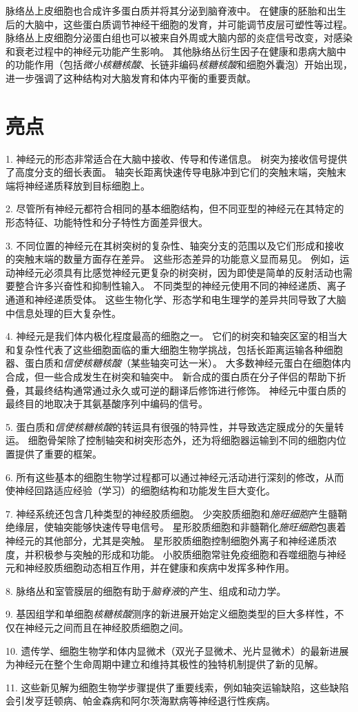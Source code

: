 脉络丛上皮细胞也合成许多蛋白质并将其分泌到脑脊液中。
在健康的胚胎和出生后的大脑中，这些蛋白质调节神经干细胞的发育，并可能调节皮层可塑性等过程。
脉络丛上皮细胞分泌蛋白组也可以被来自外周或大脑内部的炎症信号改变，对感染和衰老过程中的神经元功能产生影响。
其他脉络丛衍生因子在健康和患病大脑中的功能作用（包括\textit{微小核糖核酸}、长链非编码\textit{核糖核酸}和细胞外囊泡）开始出现，进一步强调了这种结构对大脑发育和体内平衡的重要贡献。



\section{亮点}

1. 神经元的形态非常适合在大脑中接收、传导和传递信息。
树突为接收信号提供了高度分支的细长表面。
轴突长距离快速传导电脉冲到它们的突触末端，突触末端将神经递质释放到目标细胞上。


2. 尽管所有神经元都符合相同的基本细胞结构，但不同亚型的神经元在其特定的形态特征、功能特性和分子特性方面差异很大。


3. 不同位置的神经元在其树突树的复杂性、轴突分支的范围以及它们形成和接收的突触末端的数量方面存在差异。
这些形态差异的功能意义显而易见。
例如，运动神经元必须具有比感觉神经元更复杂的树突树，因为即使是简单的反射活动也需要整合许多兴奋性和抑制性输入。
不同类型的神经元使用不同的神经递质、离子通道和神经递质受体。
这些生物化学、形态学和电生理学的差异共同导致了大脑中信息处理的巨大复杂性。


4. 神经元是我们体内极化程度最高的细胞之一。
它们的树突和轴突区室的相当大和复杂性代表了这些细胞面临的重大细胞生物学挑战，包括长距离运输各种细胞器、蛋白质和\textit{信使核糖核酸}（某些轴突可达一米）。
大多数神经元蛋白在细胞体内合成，但一些合成发生在树突和轴突中。
新合成的蛋白质在分子伴侣的帮助下折叠，其最终结构通常通过永久或可逆的翻译后修饰进行修饰。
神经元中蛋白质的最终目的地取决于其氨基酸序列中编码的信号。


5. 蛋白质和\textit{信使核糖核酸}的转运具有很强的特异性，并导致选定膜成分的矢量转运。
细胞骨架除了控制轴突和树突形态外，还为将细胞器运输到不同的细胞内位置提供了重要的框架。


6. 所有这些基本的细胞生物学过程都可以通过神经元活动进行深刻的修改，从而使神经回路适应经验（学习）的细胞结构和功能发生巨大变化。


7. 神经系统还包含几种类型的神经胶质细胞。
少突胶质细胞和\textit{施旺细胞}产生髓鞘绝缘层，使轴突能够快速传导电信号。
星形胶质细胞和非髓鞘化\textit{施旺细胞}包裹着神经元的其他部分，尤其是突触。 
星形胶质细胞控制细胞外离子和神经递质浓度，并积极参与突触的形成和功能。
小胶质细胞常驻免疫细胞和吞噬细胞与神经元和神经胶质细胞动态相互作用，并在健康和疾病中发挥多种作用。


8. 脉络丛和室管膜层的细胞有助于\textit{脑脊液}的产生、组成和动力学。


9. 基因组学和单细胞\textit{核糖核酸}测序的新进展开始定义细胞类型的巨大多样性，不仅在神经元之间而且在神经胶质细胞之间。


10. 遗传学、细胞生物学和体内显微术（双光子显微术、光片显微术）的最新进展为神经元在整个生命周期中建立和维持其极性的独特机制提供了新的见解。


11. 这些新见解为细胞生物学步骤提供了重要线索，例如轴突运输缺陷，这些缺陷会引发亨廷顿病、帕金森病和阿尔茨海默病等神经退行性疾病。



